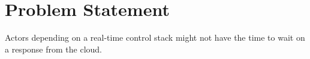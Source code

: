 \section{Problem Statement}

Actors depending on a real-time control stack might not have the time to wait on
a response from the cloud.

